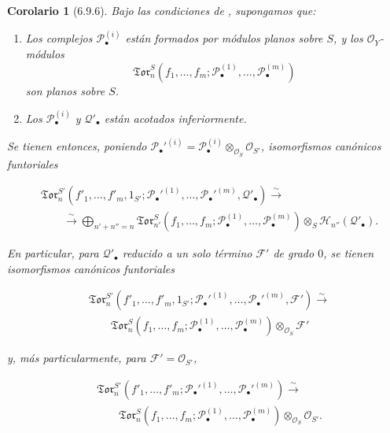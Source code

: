 \documentclass[10pt,oneside,openany]{book}
\theoremstyle{egaenv}\newtheorem*{env}{---}
\theoremstyle{egastatement}
\newtheorem*{corollary}{Corolario}
\theoremstyle{egadescription}
\newcommand{\oldpage}[2][]{\marginnote{\normalfont\scriptsize\textbf{#1}\,|\,#2}\ignorespaces}
\begin{document}
\begin{corollary}[6.9.6]
\label{III.6.9.6}
Bajo las condiciones de , supongamos que:
\begin{enumerate}
  \item[$1^\circ$] Los complejos $\mathscr P_\bullet^{(i)}$ están formados
  por módulos planos sobre $S$, y los $\mathscr O_Y$-módulos
  \[
    \mathfrak{Tor}_n^S
    (f_1,\ldots,f_m;
     \mathscr P_\bullet^{(1)},\ldots,\mathscr P_\bullet^{(m)})
  \]
  son planos sobre $S$.
  \item[$2^\circ$] Los $\mathscr P_\bullet^{(i)}$ y
  $\mathscr Q'_\bullet$ están acotados inferiormente.
\end{enumerate}

\oldpage[III]{169}
Se tienen entonces, poniendo
$\mathscr P_\bullet'^{(i)}=
\mathscr P_\bullet^{(i)}\otimes_{\mathscr O_S}\mathscr O_{S'}$,
isomorfismos canónicos funtoriales

\label{III.6.9.6.1}
\[
\begin{split}
  &\mathfrak{Tor}_n^{S'}
  (f'_1,\ldots,f'_m,1_{S'};
   \mathscr P_\bullet'^{(1)},\ldots,
   \mathscr P_\bullet'^{(m)},\mathscr Q'_\bullet)
  \xrightarrow{\sim}\\
  &\qquad\xrightarrow{\sim}
  \bigoplus_{n'+n''=n}
  \mathfrak{Tor}_{n'}^S
  (f_1,\ldots,f_m;
   \mathscr P_\bullet^{(1)},\ldots,
   \mathscr P_\bullet^{(m)})
  \otimes_S\mathscr H_{n''}(\mathscr Q'_\bullet).
\end{split}
\tag{6.9.6.1}\label{III.6.9.6.1.fr}
\]

En particular, para $\mathscr Q'_\bullet$ reducido a un solo término
$\mathscr F'$ de grado $0$, se tienen isomorfismos canónicos funtoriales

\label{III.6.9.6.2}
\[
\begin{split}
  &\mathfrak{Tor}_n^{S'}
  (f'_1,\ldots,f'_m,1_{S'};
   \mathscr P_\bullet'^{(1)},\ldots,
   \mathscr P_\bullet'^{(m)},\mathscr F')
  \xrightarrow{\sim}\\
  &\qquad
  \mathfrak{Tor}_n^S
  (f_1,\ldots,f_m;
   \mathscr P_\bullet^{(1)},\ldots,
   \mathscr P_\bullet^{(m)})
  \otimes_{\mathscr O_S}\mathscr F'
\end{split}
\tag{6.9.6.2}\label{III.6.9.6.2.fr}
\]

y, más particularmente, para $\mathscr F'=\mathscr O_{S'}$,

\label{III.6.9.6.3}
\[
\begin{split}
  &\mathfrak{Tor}_n^{S'}
  (f'_1,\ldots,f'_m;
   \mathscr P_\bullet'^{(1)},\ldots,
   \mathscr P_\bullet'^{(m)})
  \xrightarrow{\sim}\\
  &\qquad
  \mathfrak{Tor}_n^S
  (f_1,\ldots,f_m;
   \mathscr P_\bullet^{(1)},\ldots,
   \mathscr P_\bullet^{(m)})
  \otimes_{\mathscr O_S}\mathscr O_{S'}.
\end{split}
\tag{6.9.6.3}\label{III.6.9.6.3.fr}
\]

\end{corollary}
\end{document}
